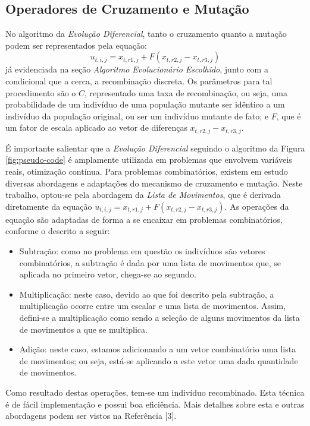 \documentclass[12pt]{elsarticle}
\begin{document}
	\subsection{Operadores de Cruzamento e Mutação}
	No algoritmo da \textit{Evolução Diferencial}, tanto o cruzamento quanto a mutação podem ser representados pela equação: 
	\[u_{t,i,j} = x_{t,r1,j}+F(x_{t,r2,j}-x_{t,r3,j})\]
	já evidenciada na seção \textit{Algoritmo Evolucionário Escolhido}, junto com a condicional que a cerca, a recombinação discreta. Os parâmetros para tal procedimento são o $C$, representado uma taxa de recombinação, ou seja, uma probabilidade de um indivíduo de uma população mutante ser idêntico a um indivíduo da população original, ou ser um indivíduo mutante de fato; e $F$, que é um fator de escala aplicado ao vetor de diferenças $x_{t,r2,j}-x_{t,r3,j}$.
	
	É importante salientar que a \textit{Evolução Diferencial} seguindo o algoritmo da Figura \ref{fig:pseudo-code} é amplamente utilizada em problemas que envolvem variáveis reais, otimização contínua. Para problemas combinatórios, existem em estudo diversas abordagens e adaptações do mecanismo de cruzamento e mutação. Neste trabalho, optou-se pela abordagem da \textit{Lista de Movimentos}, que é derivada diretamente da equação $u_{t,i,j} = x_{t,r1,j}+F(x_{t,r2,j}-x_{t,r3,j})$. As operações da equação são adaptadas de forma a se encaixar em problemas combinatórios, conforme o descrito a seguir:
	\begin{itemize}
		\item Subtração: como no problema em questão os indivíduos são vetores combinatórios, a subtração é dada por uma lista de movimentos que, se aplicada no primeiro vetor, chega-se ao segundo.
		\item Multiplicação: neste caso, devido ao que foi descrito pela subtração, a multiplicação ocorre entre um escalar e uma lista de movimentos. Assim, defini-se a multiplicação como sendo a seleção de alguns movimentos da lista de movimentos a que se multiplica.
		\item Adição: neste caso, estamos adicionando a um vetor combinatório uma lista de movimentos; ou seja, está-se aplicando a este vetor uma dada quantidade de movimentos.
	\end{itemize}
	
	Como resultado destas operações, tem-se um indivíduo recombinado. Esta técnica é de fácil implementação e possui boa eficiência. Mais detalhes sobre esta e outras abordagens podem ser vistos na Referência [3].
	
\end{document}
